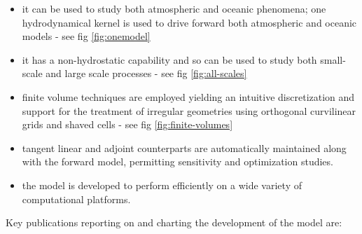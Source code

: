 \begin{itemize}
\item it can be used to study both atmospheric and oceanic phenomena; one
hydrodynamical kernel is used to drive forward both atmospheric and oceanic
models - see fig \ref{fig:onemodel}



\item it has a non-hydrostatic capability and so can be used to study both
small-scale and large scale processes - see fig \ref{fig:all-scales}



\item finite volume techniques are employed yielding an intuitive
discretization and support for the treatment of irregular geometries using
orthogonal curvilinear grids and shaved cells - see fig \ref{fig:finite-volumes}



\item tangent linear and adjoint counterparts are automatically maintained
along with the forward model, permitting sensitivity and optimization
studies.

\item the model is developed to perform efficiently on a wide variety of
computational platforms.
\end{itemize}

Key publications reporting on and charting the development of the model are:

